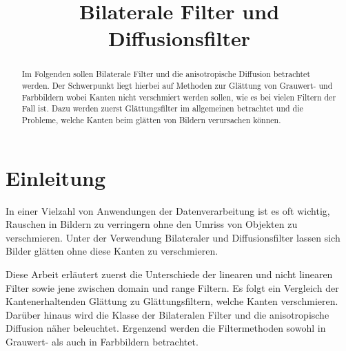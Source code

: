\documentclass[conference]{IEEEtran}
\begin{document}
%
\title{Bilaterale Filter und Diffusionsfilter}


\author{
}


\maketitle


\begin{abstract}

Im Folgenden sollen Bilaterale Filter und die anisotropische Diffusion betrachtet werden. Der Schwerpunkt liegt hierbei auf Methoden zur Glättung von Grauwert- und Farbbildern wobei Kanten nicht verschmiert werden sollen, wie es bei vielen Filtern der Fall ist. Dazu werden zuerst Glättungsfilter im allgemeinen betrachtet und die Probleme, welche Kanten beim glätten von Bildern verursachen können. 

\end{abstract}

\IEEEpeerreviewmaketitle



\section{Einleitung}

In einer Vielzahl von Anwendungen der Datenverarbeitung ist es oft wichtig, Rauschen in Bildern zu verringern ohne den Umriss von Objekten zu verschmieren. Unter der Verwendung Bilateraler und Diffusionsfilter lassen sich Bilder glätten ohne diese Kanten zu verschmieren.

Diese Arbeit erläutert zuerst die Unterschiede der linearen und nicht linearen Filter sowie jene zwischen domain und range Filtern. Es folgt ein Vergleich der Kantenerhaltenden Glättung zu Glättungsfiltern, welche Kanten verschmieren. Darüber hinaus wird die Klasse der Bilateralen Filter und die anisotropische Diffusion näher beleuchtet. Ergenzend werden die Filtermethoden sowohl in Grauwert- als auch in Farbbildern betrachtet.
\end{document}
